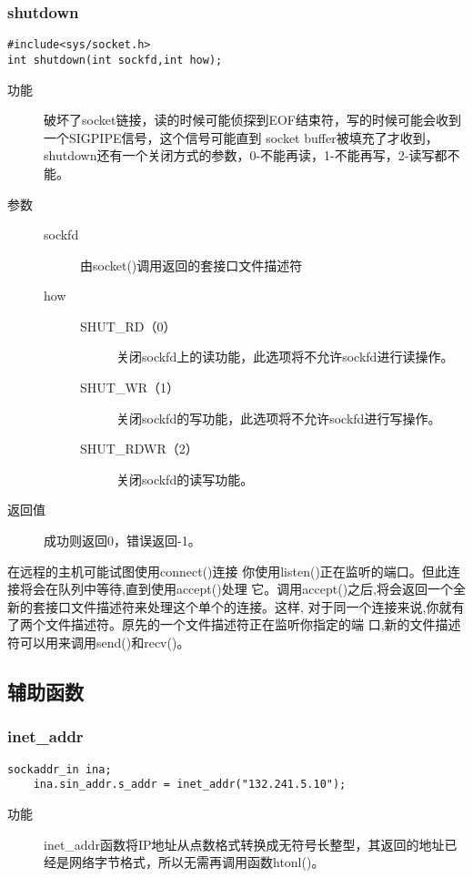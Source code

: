 \subsubsection{shutdown}
\begin{lstlisting}[style=C]
#include<sys/socket.h>
int shutdown(int sockfd,int how);
\end{lstlisting}
\begin{description}
\item[功能]	破坏了socket链接，读的时候可能侦探到EOF结束符，写的时候可能会收到一个SIGPIPE信号，这个信号可能直到
socket buffer被填充了才收到，shutdown还有一个关闭方式的参数，0-不能再读，1-不能再写，2-读写都不能。
\item[参数]		 
\begin{description}
\item[sockfd]	由socket()调用返回的套接口文件描述符
\item[how]		
\begin{description}
\item[SHUT\_{}RD（0）]	关闭sockfd上的读功能，此选项将不允许sockfd进行读操作。
\item[SHUT\_{}WR（1）]	关闭sockfd的写功能，此选项将不允许sockfd进行写操作。
\item[SHUT\_{}RDWR（2）]	关闭sockfd的读写功能。
\end{description}
\end{description}
\item[返回值]		成功则返回0，错误返回-1。
\end{description}



在远程的主机可能试图使用connect()连接
你使用listen()正在监听的端口。但此连接将会在队列中等待,直到使用accept()处理
它。调用accept()之后,将会返回一个全新的套接口文件描述符来处理这个单个的连接。这样,
对于同一个连接来说,你就有了两个文件描述符。原先的一个文件描述符正在监听你指定的端
口,新的文件描述符可以用来调用send()和recv()。


















\subsection{辅助函数}
\subsubsection{inet\_{}addr}
\begin{lstlisting}[style=C]
	sockaddr_in ina;
	ina.sin_addr.s_addr = inet_addr("132.241.5.10");
\end{lstlisting}
\begin{description}
\item[功能]	inet\_{}addr函数将IP地址从点数格式转换成无符号长整型，其返回的地址已经是网络字节格式，所以无需再调用函数htonl()。
\end{description}


